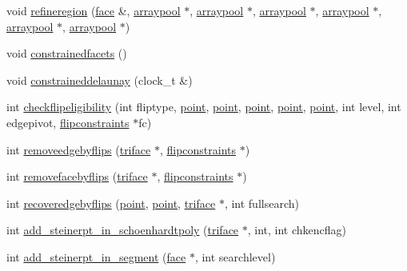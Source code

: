 \begin{DoxyCompactItemize}
\item 
void \hyperlink{classtetgenmesh_aa34a5188a4cee82197394560c388c348}{refineregion} (\hyperlink{classtetgenmesh_1_1face}{face} \&, \hyperlink{classtetgenmesh_1_1arraypool}{arraypool} $\ast$, \hyperlink{classtetgenmesh_1_1arraypool}{arraypool} $\ast$, \hyperlink{classtetgenmesh_1_1arraypool}{arraypool} $\ast$, \hyperlink{classtetgenmesh_1_1arraypool}{arraypool} $\ast$, \hyperlink{classtetgenmesh_1_1arraypool}{arraypool} $\ast$, \hyperlink{classtetgenmesh_1_1arraypool}{arraypool} $\ast$)
\item 
void \hyperlink{classtetgenmesh_a7579c3a44a54712623d9f9e5fc1dfbdc}{constrainedfacets} ()
\item 
void \hyperlink{classtetgenmesh_aab64d62b3d2b048a38158fb2bf678624}{constraineddelaunay} (clock\-\_\-t \&)
\item 
int \hyperlink{classtetgenmesh_afa19bcc54b58a65b05bf43cceaec68ec}{checkflipeligibility} (int fliptype, \hyperlink{classtetgenmesh_ace3fb4f80389185b7c9b18ab69a3dea2}{point}, \hyperlink{classtetgenmesh_ace3fb4f80389185b7c9b18ab69a3dea2}{point}, \hyperlink{classtetgenmesh_ace3fb4f80389185b7c9b18ab69a3dea2}{point}, \hyperlink{classtetgenmesh_ace3fb4f80389185b7c9b18ab69a3dea2}{point}, \hyperlink{classtetgenmesh_ace3fb4f80389185b7c9b18ab69a3dea2}{point}, int level, int edgepivot, \hyperlink{classtetgenmesh_1_1flipconstraints}{flipconstraints} $\ast$fc)
\item 
int \hyperlink{classtetgenmesh_aa3b3b69fbbdda1fcce103640425f9694}{removeedgebyflips} (\hyperlink{classtetgenmesh_1_1triface}{triface} $\ast$, \hyperlink{classtetgenmesh_1_1flipconstraints}{flipconstraints} $\ast$)
\item 
int \hyperlink{classtetgenmesh_a74795dd220990bdcf206cdc6686ab336}{removefacebyflips} (\hyperlink{classtetgenmesh_1_1triface}{triface} $\ast$, \hyperlink{classtetgenmesh_1_1flipconstraints}{flipconstraints} $\ast$)
\item 
int \hyperlink{classtetgenmesh_a558494ab92a7012fae3cfe96bb33f8e9}{recoveredgebyflips} (\hyperlink{classtetgenmesh_ace3fb4f80389185b7c9b18ab69a3dea2}{point}, \hyperlink{classtetgenmesh_ace3fb4f80389185b7c9b18ab69a3dea2}{point}, \hyperlink{classtetgenmesh_1_1triface}{triface} $\ast$, int fullsearch)
\item 
int \hyperlink{classtetgenmesh_acb5fc751eaa4a4ddffbebedfa7b7382a}{add\-\_\-steinerpt\-\_\-in\-\_\-schoenhardtpoly} (\hyperlink{classtetgenmesh_1_1triface}{triface} $\ast$, int, int chkencflag)
\item 
int \hyperlink{classtetgenmesh_a3de6e9d82e74671af7f038043b5e9bcc}{add\-\_\-steinerpt\-\_\-in\-\_\-segment} (\hyperlink{classtetgenmesh_1_1face}{face} $\ast$, int searchlevel)

\end{DoxyCompactItemize}
